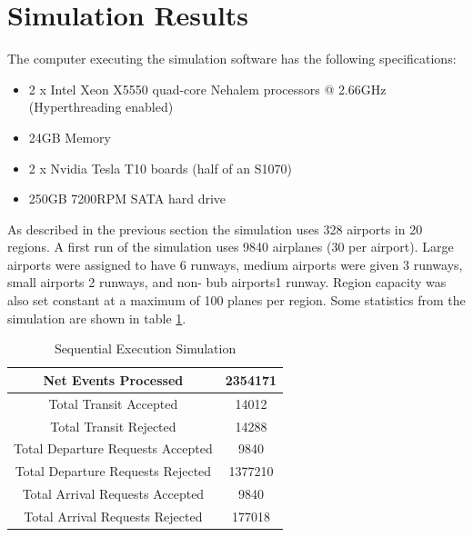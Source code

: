 \section {Simulation Results}

The computer executing the simulation software has the following specifications:

\begin{itemize}
\renewcommand{\labelitemi}{$\bullet$}
\item 2 x Intel Xeon X5550 quad-core Nehalem processors @ 2.66GHz (Hyperthreading enabled)
\item 24GB Memory
\item 2 x Nvidia Tesla T10 boards (half of an S1070)
\item 250GB 7200RPM SATA hard drive

\end{itemize}

As described in the previous section the simulation uses 328 airports in 20 regions. A first
run of the simulation uses 9840 airplanes (30 per airport). Large airports were assigned to
have 6 runways, medium airports were given 3 runways, small airports 2 runways, and non-
bub airports1 runway. Region capacity was also set constant at a maximum of 100 planes per
region. Some statistics from the simulation are shown in table \ref{table:seq_result}.

\begin{table}
\begin{center}
\addtolength{\tabcolsep}{-0pt}
\caption{Sequential Execution Simulation}
\label{table:seq_result}
\begin{tabular}{|c|c|}\hline

Net Events Processed & 2354171  \\\hline
Total Transit Accepted & 14012  \\\hline
Total Transit Rejected & 14288  \\\hline
Total Departure Requests Accepted & 9840 \\\hline
Total Departure Requests Rejected & 1377210 \\\hline
Total Arrival Requests Accepted & 9840 \\\hline
Total Arrival Requests Rejected & 177018 \\\hline

\end{tabular}
\end{center}
\end{table}


